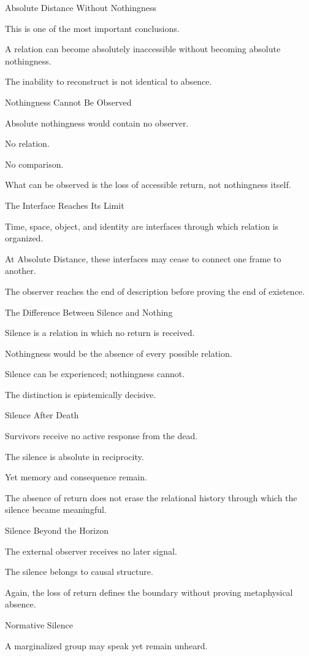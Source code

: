 Absolute Distance Without Nothingness

This is one of the most important conclusions.

A relation can become absolutely inaccessible without becoming absolute nothingness.

The inability to reconstruct is not identical to absence.

Nothingness Cannot Be Observed

Absolute nothingness would contain no observer.

No relation.

No comparison.

What can be observed is the loss of accessible return, not nothingness itself.

The Interface Reaches Its Limit

Time, space, object, and identity are interfaces through which relation is organized.

At Absolute Distance, these interfaces may cease to connect one frame to another.

The observer reaches the end of description before proving the end of existence.

The Difference Between Silence and Nothing

Silence is a relation in which no return is received.

Nothingness would be the absence of every possible relation.

Silence can be experienced; nothingness cannot.

The distinction is epistemically decisive.

Silence After Death

Survivors receive no active response from the dead.

The silence is absolute in reciprocity.

Yet memory and consequence remain.

The absence of return does not erase the relational history through which the silence became meaningful.

Silence Beyond the Horizon

The external observer receives no later signal.

The silence belongs to causal structure.

Again, the loss of return defines the boundary without proving metaphysical absence.

Normative Silence

A marginalized group may speak yet remain unheard.

